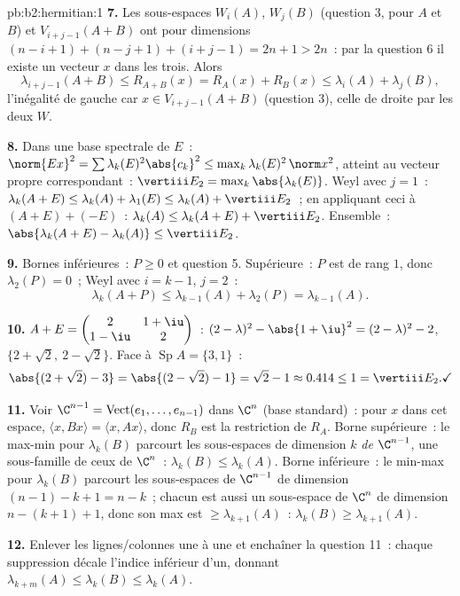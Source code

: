 \begin{solution}{pb:b2:hermitian:1}
\textbf{7.} Les sous-espaces $W_i(A)$, $W_j(B)$ (question 3, pour
$A$ et $B$) et $V_{i+j-1}(A+B)$ ont pour dimensions $(n-i+1) +
(n-j+1) + (i+j-1) = 2n + 1 > 2n$~: par la question 6 il existe un
vecteur  $x$ dans les trois. Alors
\[
\lambda_{i+j-1}(A+B) \leq R_{A+B}(x)
= R_A(x) + R_B(x) \leq \lambda_i(A) + \lambda_j(B),
\]
l'inégalité de gauche car $x \in V_{i+j-1}(A+B)$ (question
3), celle de droite par les deux $W$.

\textbf{8.} Dans une base spectrale de $E$~: $\norm{Ex}^2 = \sum
\lambda_k(E)^2\abs{c_k}^2 \leq \max_k\lambda_k(E)^2\,\norm
x^2$, atteint au vecteur propre correspondant~: $\vertiii E_2
= \max_k\abs{\lambda_k(E)}$. Weyl avec $j = 1$~: $\lambda_k(A+E)
\leq \lambda_k(A) + \lambda_1(E) \leq \lambda_k(A) + \vertiii
E_2$~; en appliquant ceci à $(A+E) + (-E)$~: $\lambda_k(A) \leq
\lambda_k(A+E) + \vertiii E_2$. Ensemble~:
$\abs{\lambda_k(A+E) - \lambda_k(A)} \leq \vertiii E_2$.

\textbf{9.} Bornes inférieures~: $P \geq 0$ et question 5. Supérieure~: $P$
est de rang $1$, donc $\lambda_2(P) = 0$~; Weyl avec $i = k-1$, $j =
2$~:
\[
\lambda_k(A + P) \leq \lambda_{k-1}(A) + \lambda_2(P)
= \lambda_{k-1}(A) .
\]

\textbf{10.} $A + E = \begin{pmatrix} 2 & 1+\iu\\ 1-\iu &
2\end{pmatrix}$~:  $(2-\lambda)^2 -
\abs{1+\iu}^2 = (2-\lambda)^2 - 2$,  $\{2 + \sqrt2,\ 2
- \sqrt2\}$. Face à $\operatorname{Sp}A = \{3, 1\}$~:
\[
\abs{(2+\sqrt2) - 3} = \abs{(2-\sqrt2) - 1} = \sqrt2 - 1
\approx 0.414 \leq 1 = \vertiii E_2 . \checkmark
\]

\textbf{11.} Voir $\C^{n-1} = \operatorname{Vect}(e_1, \dots,
e_{n-1})$ dans $\C^n$ (base standard)~: pour $x$ dans cet espace,
$\langle x, Bx\rangle = \langle x, Ax\rangle$, donc $R_B$ est la
restriction de $R_A$. Borne supérieure~: le max-min pour $\lambda_k
(B)$ parcourt les sous-espaces de dimension $k$ \emph{de}
$\C^{n-1}$, une sous-famille de ceux de $\C^n$~: $\lambda_k(B) \leq
\lambda_k(A)$. Borne inférieure~: le min-max pour $\lambda_k(B)$
parcourt les sous-espaces de $\C^{n-1}$ de dimension $(n-1)-k+1 =
n-k$~; chacun est aussi un sous-espace de $\C^n$ de dimension $n -
(k+1) + 1$, donc son max est $\geq \lambda_{k+1}(A)$~:
$\lambda_k(B) \geq \lambda_{k+1}(A)$.

\textbf{12.} Enlever les lignes/colonnes une à une et enchaîner
la question 11~: chaque suppression décale l'indice inférieur d'un,
donnant $\lambda_{k+m}(A) \leq \lambda_k(B) \leq \lambda_k(A)$.


\end{solution}
